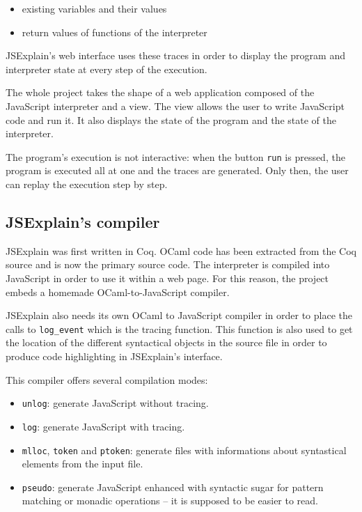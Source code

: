 \documentclass[twocolumn]{article}
\begin{document}
\begin{itemize}
  \item existing variables and their values
  \item return values of functions of the interpreter
\end{itemize}

JSExplain's web interface uses these traces in order to display the program and
interpreter state at every step of the execution.

The whole project takes the shape of a web application composed of the
JavaScript interpreter and a view. The view allows the user to write JavaScript
code and run it. It also displays the state of the program and the state of the
interpreter.

The program's execution is not interactive: when the button \texttt{run} is
pressed, the program is executed all at one and the traces are generated. Only
then, the user can replay the execution step by step.

\subsection{JSExplain's compiler}

JSExplain was first written in Coq. OCaml code has been extracted from the Coq
source and is now the primary source code. The interpreter is compiled into
JavaScript in order to use it within a web page. For this reason, the project
embeds a homemade OCaml-to-JavaScript compiler.

JSExplain also needs its own OCaml to JavaScript compiler in order to place the
calls to \verb|log_event| which is the tracing function. This function is also
used to get the location of the different syntactical objects in the source
file in order to produce code highlighting in JSExplain's interface.

This compiler offers several compilation modes:

\begin{itemize}
  \item \texttt{unlog}: generate JavaScript without tracing.
  \item \texttt{log}: generate JavaScript with tracing.
  \item \texttt{mlloc}, \texttt{token} and \texttt{ptoken}: generate files with
    informations about syntastical elements from the input file.
  \item \texttt{pseudo}: generate JavaScript enhanced with syntactic sugar for
    pattern matching or monadic operations -- it is supposed to be easier to
    read.
\end{itemize}
\end{document}
